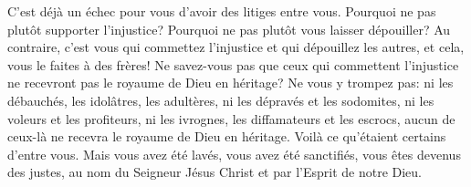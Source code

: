 C’est déjà un échec pour vous d’avoir des litiges entre vous.
Pourquoi ne pas plutôt supporter l’injustice?
Pourquoi ne pas plutôt vous laisser dépouiller?
Au contraire, c’est vous qui commettez l’injustice et qui dépouillez les autres,
	et cela, vous le faites à des frères!
Ne savez-vous pas que ceux qui commettent l’injustice
	ne recevront pas le royaume de Dieu en héritage?
Ne vous y trompez pas: ni les débauchés, les idolâtres, les adultères,
	ni les dépravés et les sodomites, ni les voleurs et les profiteurs,
	ni les ivrognes, les diffamateurs et les escrocs,
	aucun de ceux-là ne recevra le royaume de Dieu en héritage.
Voilà ce qu’étaient certains d’entre vous.
Mais vous avez été lavés, vous avez été sanctifiés,
	vous êtes devenus des justes,
	au nom du Seigneur Jésus Christ et par l’Esprit de notre Dieu.
